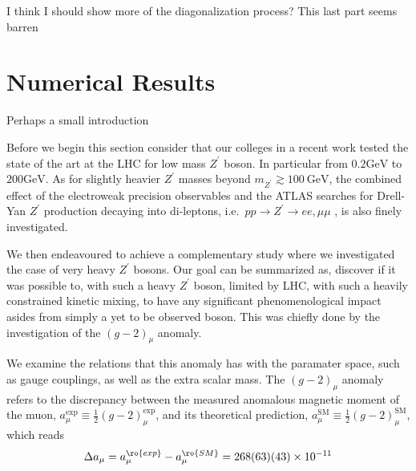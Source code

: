 { \color{blue} I think I should show more of the diagonalization process? This last part seems barren } 




\section{Numerical Results}

{ \color{blue} Perhaps a small introduction }  

Before we begin this section consider that our colleges in a recent work tested the state of the art at the LHC for low mass $Z^\prime$ boson. In particular from $0.2 \mathrm{GeV}$ to $200 \mathrm{GeV}$. As for slightly heavier $Z^\prime$ masses beyond $m_{Z^\prime} \gtrsim 100~\mathrm{GeV}$, the combined effect of the electroweak precision observables and the ATLAS searches for Drell-Yan $Z^\prime$ production decaying into di-leptons, i.e.~$pp \to Z^\prime \to ee,\mu \mu$ \cite{Aaboud:2017buh}, is also finely investigated.

We then endeavoured to achieve a complementary study where we investigated the case of very heavy $Z^\prime$ bosons. 
%
Our goal can be summarized as, discover if it was possible to, with such a heavy $Z^\prime$ boson, limited by LHC, with such a heavily constrained kinetic mixing, to have any significant phenomenological impact asides from simply a yet to be observed boson. This was chiefly done by the investigation of the  $\left(g-2\right)_\mu$ anomaly. 

We examine the relations that this anomaly has with the paramater space, such as gauge couplings, as well as the extra scalar mass. The $\left( g-2 \right)_\mu$ anomaly refers to the discrepancy between the measured anomalous magnetic moment of the muon,
$a_\mu^{\mathrm{\text{exp}}} \equiv \tfrac{1}{2} \left( g-2 \right)^{\mathrm{\text{exp}}}_\mu$, and its theoretical prediction, $a_\mu^{\mathrm{SM}} \equiv \tfrac{1}{2} \left(g-2\right)^{\mathrm{SM}}_\mu$, which reads \cite{Tanabashi:2018oca}
\begin{equation}
	\label{g-2}
	\Delta a_\mu = a_\mu^{\ro{exp}} - a_\mu^{\ro{SM}} = 268(63)(43) \times 10^{-11}
\end{equation}

